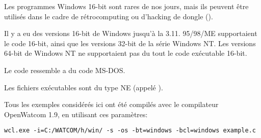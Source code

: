 
Les programmes Windows 16-bit sont rares de nos jours, mais ils peuvent être utilisés
dans le cadre de rétrocomputing ou d'hacking de dongle ().

Il y a eu des versions 16-bit de Windows jusqu'à la 3.11.
95/98/ME
supportaient le code 16-bit, ainsi que les versions 32-bit de la série \gls{Windows NT}.
Les versions 64-bit de \gls{Windows NT} ne supportaient pas du tout le code exécutable
16-bit.

Le code ressemble a du code MS-DOS.

Les fichiers exécutables sont du type NE (appelé ).

Tous les exemples considérés ici ont été compilés avec le compilateur OpenWatcom 1.9,
en utilisant ces paramètres:\\

\begin{lstlisting}
wcl.exe -i=C:/WATCOM/h/win/ -s -os -bt=windows -bcl=windows example.c
\end{lstlisting}








